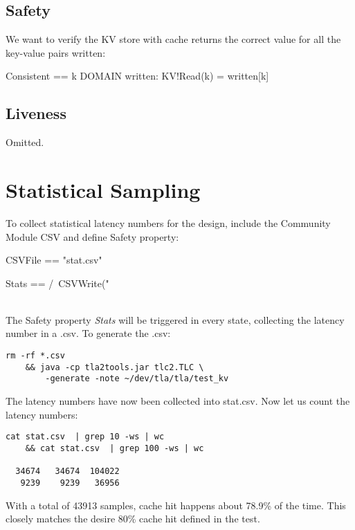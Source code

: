 \subsection{Safety}

We want to verify the KV store with cache returns the correct value for 
all the key-value pairs written:\\

\begin{tla}
Consistent == 
    \A k \in DOMAIN written: 
        KV!Read(k) = written[k]
\end{tla}
\begin{tlatex}
%
%
%
\end{tlatex}

\subsection{Liveness}

Omitted.

\section{Statistical Sampling}

To collect statistical latency numbers for the design, include the Community
Module CSV and define Safety property:\\

\begin{tla}
CSVFile ==
    "stat.csv"

Stats ==
    /\ CSVWrite("%
\end{tla}
\begin{tlatex}
%
%
\@pvspace{8.0pt}%
%
\end{tlatex}
\\

The Safety property \textit{Stats} will be triggered in every state, collecting
the latency number in a .csv. To generate the .csv: 

\begin{verbatim}
rm -rf *.csv 
    && java -cp tla2tools.jar tlc2.TLC \
        -generate -note ~/dev/tla/tla/test_kv
\end{verbatim}

The latency numbers have now been collected into stat.csv. Now let us count the
latency numbers:

\begin{verbatim}
cat stat.csv  | grep 10 -ws | wc 
    && cat stat.csv  | grep 100 -ws | wc

  34674   34674  104022
   9239    9239   36956
\end{verbatim}

With a total of 43913 samples, cache hit happens about 78.9\% of the time. This 
closely matches the desire 80\% cache hit defined in the test.

% 

